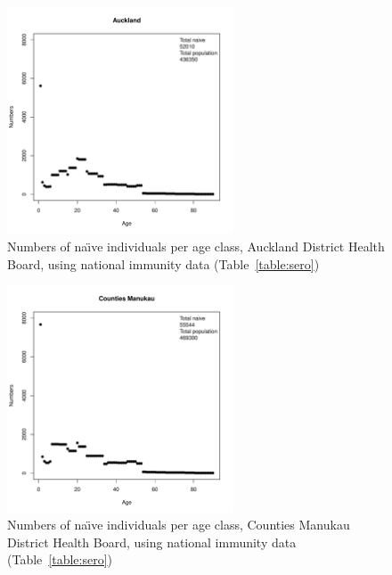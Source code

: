 \documentclass{article}
\begin{document}
\begin{itemize}
\begin{figure}[H]
     \begin{center}
     \includegraphics[width=0.6\textwidth]{dhb3.pdf}
     \end{center}
     \caption{Numbers of na\"{\i}ve individuals per age class, Auckland District Health Board, using national immunity data (Table~\ref{table:sero})}
     \label{fig:Auckland}
\end{figure}

\begin{figure}[H]
     \begin{center}
     \includegraphics[width=0.6\textwidth]{dhb4.pdf}
     \end{center}
     \caption{Numbers of na\"{\i}ve individuals per age class, Counties Manukau District Health Board, using national immunity data (Table~\ref{table:sero})}
     \label{fig:Counties_Manukau}
\end{figure}


\end{itemize}
\end{document}
